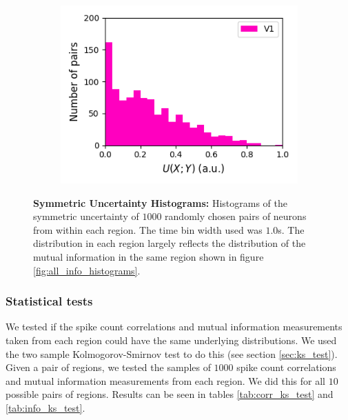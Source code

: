 \documentclass[a4paper,12pt]{article}
\theoremstyle{definition}
\begin{document}
\begin{figure}[p]
\begin{subfigure}{0.5\textwidth}
    \includegraphics[width=\textwidth]{figures/all_v1_6_1p0_symm_unc_histogram.png}
  \end{subfigure}
  \caption{\textbf{Symmetric Uncertainty Histograms:} Histograms of the symmetric uncertainty of $1000$ randomly chosen pairs of neurons from within each region. The time bin width used was $1.0$s. The distribution in each region largely reflects the distribution of the mutual information in the same region shown in figure \ref{fig:all_info_histograms}.}
  \label{fig:all_symm_unc_histograms}
\end{figure}

\subsubsection{Statistical tests}
We tested if the spike count correlations and mutual information measurements taken from each region could have the same underlying distributions. We used the two sample Kolmogorov-Smirnov test to do this (see section \ref{sec:ks_test}). Given a pair of regions, we tested the samples of $1000$ spike count correlations and mutual information measurements from each region. We did this for all $10$ possible pairs of regions. Results can be seen in tables \ref{tab:corr_ks_test} and \ref{tab:info_ks_test}.
\end{document}
